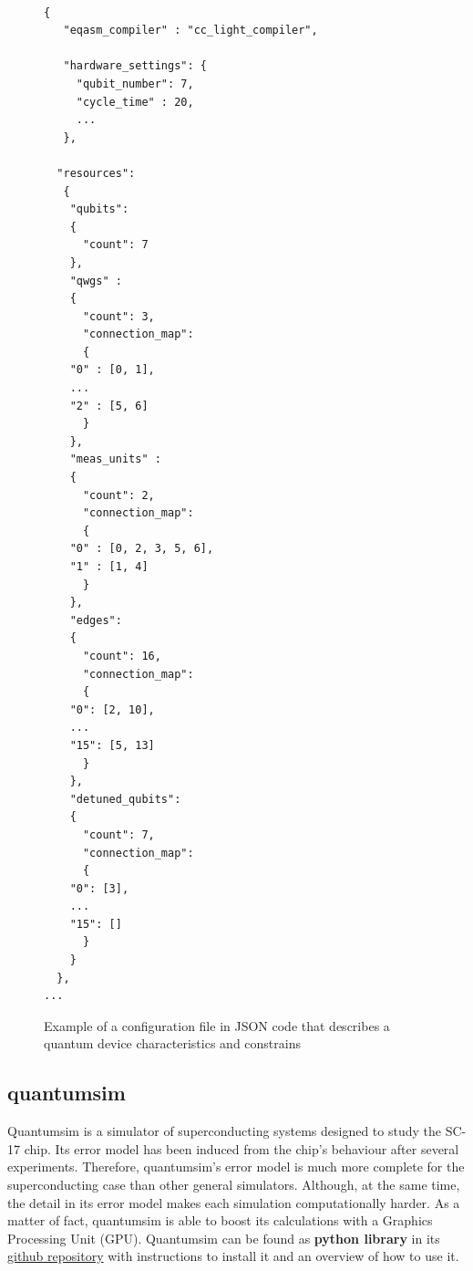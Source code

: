 \begin{figure}
\centering

\begin{verbatim}

{
   "eqasm_compiler" : "cc_light_compiler",

   "hardware_settings": {
	 "qubit_number": 7,
	 "cycle_time" : 20,  
     ...
   },

  "resources":
   {
    "qubits":
    {
      "count": 7
    },
    "qwgs" :
    {
      "count": 3,
      "connection_map":
      {
	"0" : [0, 1],
	...
	"2" : [5, 6]
      }
    },
    "meas_units" :
    {
      "count": 2,
      "connection_map":
      {
	"0" : [0, 2, 3, 5, 6],
	"1" : [1, 4]
      }
    },
    "edges":
    {  
      "count": 16,
      "connection_map":
      {
	"0": [2, 10], 
	...
	"15": [5, 13]
      }
    },
    "detuned_qubits":
    {     
      "count": 7,
      "connection_map":
      {
	"0": [3],
	...
	"15": []
      }
    }
  },
...

\end{verbatim}



\caption{Example of a configuration file in JSON code that describes a quantum device characteristics and constrains}
\label{code:json_sc7}
\end{figure}

\subsection*{quantumsim}
\label{sec:orgde8df74}

Quantumsim \cite{O_Brien_2017} is a simulator of superconducting systems designed to study the SC-17 chip.
Its error model has been induced from the chip's behaviour after several experiments.
Therefore, quantumsim's error model is much more complete for the superconducting case than other general simulators.
Although, at the same time, the detail in its error model makes each simulation computationally harder.
As a matter of fact, quantumsim is able to boost its calculations with a Graphics Processing Unit (GPU).
Quantumsim can be found as \textbf{python library} in its \href{https://github.com/quantumsim/quantumsim}{github repository} with instructions to install it and an overview of how to use it.


